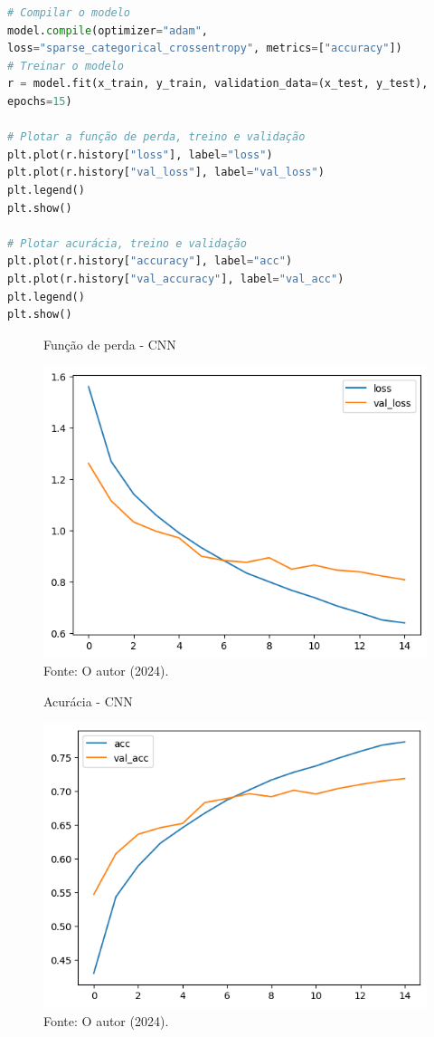 \begin{lstlisting}[language=Python, style=input]
# Compilar o modelo
model.compile(optimizer="adam",
loss="sparse_categorical_crossentropy", metrics=["accuracy"])
# Treinar o modelo
r = model.fit(x_train, y_train, validation_data=(x_test, y_test),
epochs=15)

# Plotar a função de perda, treino e validação
plt.plot(r.history["loss"], label="loss")
plt.plot(r.history["val_loss"], label="val_loss")
plt.legend()
plt.show()

# Plotar acurácia, treino e validação
plt.plot(r.history["accuracy"], label="acc")
plt.plot(r.history["val_accuracy"], label="val_acc")
plt.legend()
plt.show()
\end{lstlisting}

\begin{figure}[H]
\centering
\caption{Função de perda - CNN}
\includegraphics[width=.8\linewidth]{apendices/fig/9_IAA009_1.png}
\caption*{Fonte: O autor (2024).}
\end{figure}

\begin{figure}[H]
\centering
\caption{Acurácia - CNN}
\includegraphics[width=.8\linewidth]{apendices/fig/9_IAA009_2.png}
\caption*{Fonte: O autor (2024).}
\end{figure}


